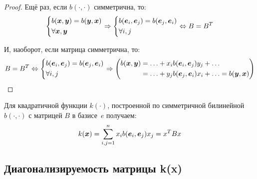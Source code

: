 \documentclass[a4paper,12pt]{article}
\begin{document}
  \begin{proof}
    Ещё раз, если $b(\cdot, \cdot)$ симметрична, то:
    \[
      \left\{
        \begin{aligned}
          &b(\boldsymbol x, \boldsymbol y) = b(\boldsymbol y, \boldsymbol x)\\
          &\forall \boldsymbol x, \boldsymbol y
        \end{aligned}
      \right. \Rightarrow \left\{
        \begin{aligned}
          &b(\boldsymbol e_i, \boldsymbol e_j) = b(\boldsymbol e_j, \boldsymbol e_i)\\
          &\forall i, j
        \end{aligned}
      \right.
      \Leftrightarrow B = B^T
    \]
    
    И, наоборот, если матрица симметрична, то:
    \[
      B = B^T \Leftrightarrow \left\{
        \begin{aligned}
          &b(\bds e_i, \bds e_j) = b(\bds e_j, \bds e_i)\\
          &\forall i, j
        \end{aligned}
      \right. \Rightarrow %
        \left(
          \begin{aligned}
            b(\bds x, \bds y) &= \ldots + x_i b(\bds e_i, \bds e_j) y_j + \ldots\\
                              &= \ldots + y_j b(\bds e_j, \bds e_i) x_i + \ldots = b(\bds y, \bds x)
          \end{aligned}
        \right)
    \]
  \end{proof}
  
  Для квадратичной функции $k(\cdot)$, построенной по симметричной билинейной $b(\cdot, \cdot)$ с матрицей $B$ в базисе~$e$ получаем:
  \[
    k(\boldsymbol x) = \sum_{i, j = 1}^{n} x_i b(\boldsymbol e_i, \boldsymbol e_j) x_j = x^T B x
  \]
  
  
  \subsection{Диагонализируемость матрицы k(x)}
  
\end{document}
